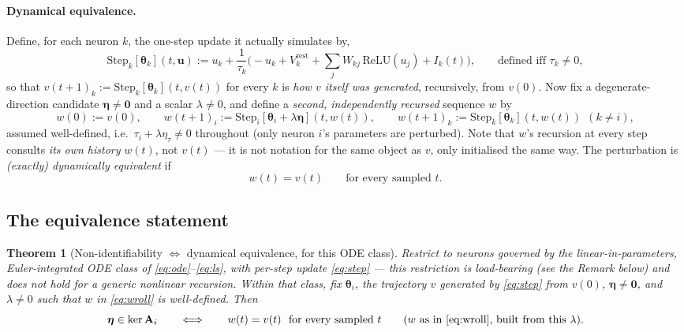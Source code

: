 \documentclass[11pt]{article}
\newcommand{\Mat}[1]{\mathbf{#1}}
\newcommand{\A}{\Mat{A}}
\newcommand{\thet}{\boldsymbol{\theta}}
\newtheorem{theorem}{Theorem}
\begin{document}
\paragraph{Dynamical equivalence.} Define, for each neuron $k$, the one-step
update it actually simulates by,
\begin{equation}
\mathrm{Step}_k[\thet_k](t,\Mat u) := u_k + \frac{1}{\tau_k}\Big(-u_k +
V_k^{\mathrm{rest}} + \textstyle\sum_j W_{kj}\,\mathrm{ReLU}(u_j) + I_k(t)\Big) ,
\qquad \text{defined iff } \tau_k\neq0,
\label{eq:step}
\end{equation}
so that $v(t{+}1)_k := \mathrm{Step}_k[\thet_k](t,v(t))$ for every $k$ is
\emph{how $v$ itself was generated}, recursively, from $v(0)$. Now fix a
degenerate-direction candidate $\boldsymbol\eta\neq\Mat 0$ and a scalar
$\lambda\neq0$, and define a \emph{second, independently recursed} sequence
$w$ by
\begin{equation}
w(0):=v(0), \qquad
w(t{+}1)_i := \mathrm{Step}_i[\thet_i+\lambda\boldsymbol\eta](t,w(t)), \qquad
w(t{+}1)_k := \mathrm{Step}_k[\thet_k](t,w(t))\ \ (k\neq i) ,
\label{eq:wroll}
\end{equation}
assumed well-defined, i.e.\ $\tau_i+\lambda\eta_\tau\neq0$ throughout (only
neuron $i$'s parameters are perturbed). Note that $w$'s recursion at every
step consults \emph{its own history} $w(t)$, not $v(t)$ --- it is not
notation for the same object as $v$, only initialised the same way. The
perturbation is \emph{(exactly) dynamically equivalent} if
\begin{equation}
w(t) = v(t) \qquad \text{for every sampled } t.
\label{eq:dyneq-def}
\end{equation}

\subsection{The equivalence statement}

\begin{theorem}[Non-identifiability $\iff$ dynamical equivalence, for this
ODE class]
\label{thm:equiv}
Restrict to neurons governed by the linear-in-parameters, Euler-integrated
ODE class of \eqref{eq:ode}--\eqref{eq:ls}, with per-step update
\eqref{eq:step} --- this restriction is load-bearing (see the Remark below)
and does not hold for a generic nonlinear recursion. Within that
class, fix $\thet_i$, the trajectory $v$ generated by \eqref{eq:step} from
$v(0)$, $\boldsymbol\eta\neq\Mat 0$, and $\lambda\neq 0$ such that $w$ in
\eqref{eq:wroll} is well-defined. Then
\begin{equation}
\boldsymbol\eta\in\ker\A_i
\qquad\Longleftrightarrow\qquad
w(t)=v(t) \ \text{ for every sampled } t
\qquad (w \text{ as in \eqref{eq:wroll}, built from this } \lambda) .
\label{eq:equiv-statement}
\end{equation}
\end{theorem}
\end{document}
